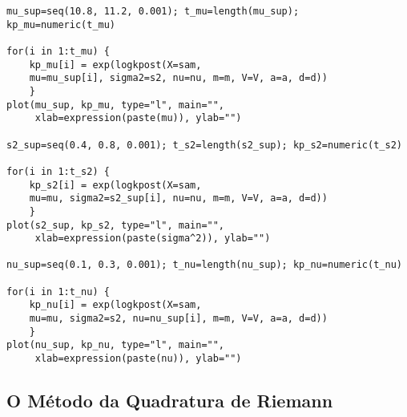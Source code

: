 \begin{verbatim}
mu_sup=seq(10.8, 11.2, 0.001); t_mu=length(mu_sup); kp_mu=numeric(t_mu)

for(i in 1:t_mu) {
	kp_mu[i] = exp(logkpost(X=sam,
	mu=mu_sup[i], sigma2=s2, nu=nu, m=m, V=V, a=a, d=d))
	}
plot(mu_sup, kp_mu, type="l", main="",
     xlab=expression(paste(mu)), ylab="")

s2_sup=seq(0.4, 0.8, 0.001); t_s2=length(s2_sup); kp_s2=numeric(t_s2)

for(i in 1:t_s2) {
	kp_s2[i] = exp(logkpost(X=sam,
	mu=mu, sigma2=s2_sup[i], nu=nu, m=m, V=V, a=a, d=d))
	}
plot(s2_sup, kp_s2, type="l", main="",
	 xlab=expression(paste(sigma^2)), ylab="")

nu_sup=seq(0.1, 0.3, 0.001); t_nu=length(nu_sup); kp_nu=numeric(t_nu)

for(i in 1:t_nu) {
	kp_nu[i] = exp(logkpost(X=sam,
	mu=mu, sigma2=s2, nu=nu_sup[i], m=m, V=V, a=a, d=d))
	}
plot(nu_sup, kp_nu, type="l", main="",
     xlab=expression(paste(nu)), ylab="")
\end{verbatim}

\subsection*{O Método da Quadratura de Riemann}

